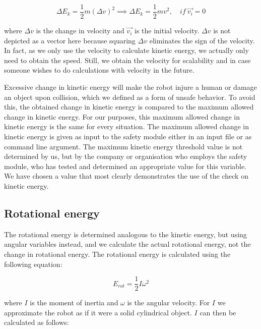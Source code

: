 \documentclass[12pt]{scrreprt}
\begin{document}
\begin{equation} \label{eq:change_ke}
    \Delta E_k = \frac{1}{2}m(\Delta v)^2 \implies \Delta E_k = \frac{1}{2}mv^2,\quad if\ \vec{v_i} = 0
\end{equation}

where $\Delta v$ is the change in velocity and $\vec{v_i}$ is the initial velocity. $\Delta v$ is not depicted as a vector here because squaring $\Delta v$ eliminates the sign of the velocity. In fact, as we only use the velocity to calculate kinetic energy, we actually only need to obtain the speed. Still, we obtain the velocity for scalability and in case someone wishes to do calculations with velocity in the future. 
\par
Excessive change in kinetic energy will make the robot injure a human or damage an object upon collision, which we defined as a form of unsafe behavior. To avoid this, the obtained change in kinetic energy is compared to the maximum allowed change in kinetic energy. For our purposes, this maximum allowed change in kinetic energy is the same for every situation. The maximum allowed change in kinetic energy is given as input to the safety module either in an input file or as command line argument. The maximum kinetic energy threshold value is not determined by us, but by the company or organisation who employs the safety module, who has tested and determined an appropriate value for this variable. We have chosen a value that most clearly demonstrates the use of the check on kinetic energy.

\subsection{Rotational energy}
\label{Rotational energy}
The rotational energy is determined analogous to the kinetic energy, but using angular variables instead, and we calculate the actual rotational energy, not the change in rotational energy. The rotational energy is calculated using the following equation:

\begin{equation} \label{eq:rot_energy}
    E_{rot} = \frac{1}{2}I\omega^2
\end{equation}

where $I$ is the moment of inertia and $\omega$ is the angular velocity. For $I$ we approximate the robot as if it were a solid cylindrical object. $I$ can then be calculated as follows:
\end{document}
